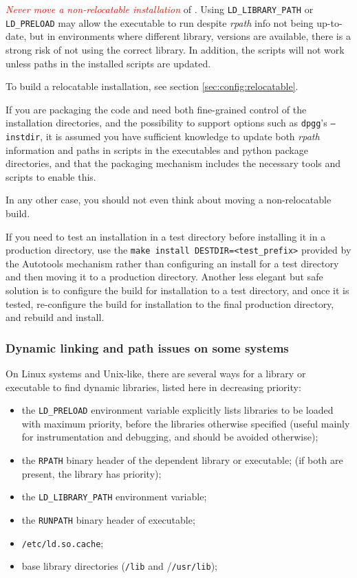 \documentclass[a4paper,10pt,twoside]{csshortdoc}
\begin{document}
\textcolor{Red}{\emph{Never move a non-relocatable installation}} of \CS.
Using \texttt{LD\_LIBRARY\_PATH} or \texttt{LD\_PRELOAD}
may allow the executable to run despite \emph{rpath} info
not being up-to-date, but in environments where different library,
versions are available, there is a strong risk of not using
the correct library. In addition, the scripts will not work
unless paths in the installed scripts are updated.

To build a relocatable installation, see section
\ref{sec:config:relocatable}.

If you are packaging the code and need both fine-grained control of
the installation directories, and the possibility to support
options such as \texttt{dpgg}'s \texttt{--instdir}, it is assumed
you have sufficient knowledge to update both \emph{rpath} information
and paths in scripts in the executables and python package directories,
and that the packaging mechanism includes the necessary tools and
scripts to enable this.

In any other case, you should not even think about moving a
non-relocatable build.

If you need to test an installation in a test directory before
installing it in a production directory, use the
\texttt{make install DESTDIR=<test\_prefix>} provided
by the Autotools mechanism rather than configuring an install for a
test directory and then moving it to a production directory.
Another less elegant but safe solution is to configure the build for
installation to a test directory, and once it is tested,
re-configure the build for installation to the final production
directory, and rebuild and install.

\subsubsection{Dynamic linking and path issues on some systems}

On Linux systems and Unix-like, there are several ways for a library or executable
to find dynamic libraries, listed here in decreasing priority:

\begin{itemize}
\item the \texttt{LD\_PRELOAD} environment variable explicitly lists
      libraries to be loaded with maximum priority, before the libraries
      otherwise specified (useful mainly for instrumentation
      and debugging, and should be avoided otherwise);
\item the \texttt{RPATH} binary header of the dependent library or executable;
      (if both are present, the library has priority);
\item the \texttt{LD\_LIBRARY\_PATH} environment variable;
\item the \texttt{RUNPATH} binary header of executable;
\item \texttt{/etc/ld.so.cache};
\item base library directories (\texttt{/lib} and /\texttt{/usr/lib});
\end{itemize}
\end{document}
